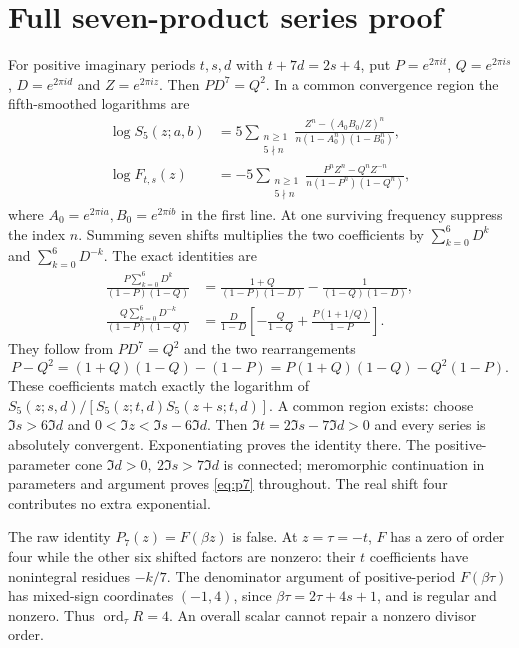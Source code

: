 \section{Full seven-product series proof}\label{sec:seven-product-proof}
For positive imaginary periods $t,s,d$ with $t+7d=2s+4$, put $P=e^{2\pi it}$, $Q=e^{2\pi is}$, $D=e^{2\pi id}$ and $Z=e^{2\pi iz}$. Then $PD^7=Q^2$. In a common convergence region the fifth-smoothed logarithms are
\begin{align*}
 \log S_5(z;a,b)&=5\sum_{\substack{n\ge1\\5\nmid n}}
 \frac{Z^n-(A_0B_0/Z)^n}{n(1-A_0^n)(1-B_0^n)},\\
 \log F_{t,s}(z)&=-5\sum_{\substack{n\ge1\\5\nmid n}}
 \frac{P^nZ^n-Q^nZ^{-n}}{n(1-P^n)(1-Q^n)},
\end{align*}
where $A_0=e^{2\pi ia},B_0=e^{2\pi ib}$ in the first line. At one surviving frequency suppress the index $n$. Summing seven shifts multiplies the two coefficients by $\sum_{k=0}^{6}D^k$ and $\sum_{k=0}^{6}D^{-k}$. The exact identities are
\begin{align*}
 \frac{P\sum_{k=0}^{6}D^k}{(1-P)(1-Q)}
 &=\frac{1+Q}{(1-P)(1-D)}-\frac1{(1-Q)(1-D)},\\
 \frac{Q\sum_{k=0}^{6}D^{-k}}{(1-P)(1-Q)}
 &=\frac{D}{1-D}\left[-\frac{Q}{1-Q}
 +\frac{P(1+1/Q)}{1-P}\right].
\end{align*}
They follow from $PD^7=Q^2$ and the two rearrangements
\[
 P-Q^2=(1+Q)(1-Q)-(1-P)
 =P(1+Q)(1-Q)-Q^2(1-P).
\]
These coefficients match exactly the logarithm of $S_5(z;s,d)/[S_5(z;t,d)S_5(z+s;t,d)]$. A common region exists: choose $\Im s>6\Im d$ and $0<\Im z<\Im s-6\Im d$. Then $\Im t=2\Im s-7\Im d>0$ and every series is absolutely convergent. Exponentiating proves the identity there. The positive-parameter cone $\Im d>0,\ 2\Im s>7\Im d$ is connected; meromorphic continuation in parameters and argument proves \eqref{eq:p7} throughout. The real shift four contributes no extra exponential.

The raw identity $P_7(z)=F(\beta z)$ is false. At $z=\tau=-t$, $F$ has a zero of order four while the other six shifted factors are nonzero: their $t$ coefficients have nonintegral residues $-k/7$. The denominator argument of positive-period $F(\beta\tau)$ has mixed-sign coordinates $(-1,4)$, since $\beta\tau=2\tau+4s+1$, and is regular and nonzero. Thus $\operatorname{ord}_{\tau}R=4$. An overall scalar cannot repair a nonzero divisor order.
